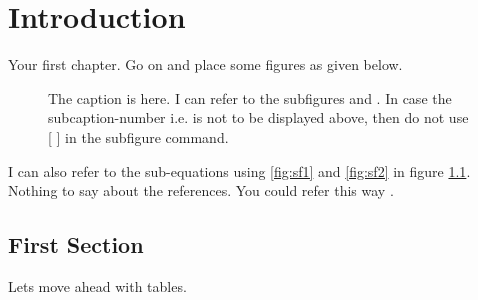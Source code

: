 \chapter{Introduction}
\label{ch:intro}

Your first chapter. Go on and place some figures as given below.
\begin{figure}[!ht]
 	\centering
 	\caption[Use this if required, which goes in `list of figures']{The caption is here. I can refer to the subfigures  and . In case the subcaption-number i.e.  is not to be displayed above, then do not use [ ] in the subfigure command.}
 	\label{fig:f1}
\end{figure}
 
I can also refer to the sub-equations using \ref{fig:sf1} and \ref{fig:sf2} in figure \ref{fig:f1}. Nothing to say about the references. You could refer this way \cite{MC:Clarke,B-Principle}.

\section{First Section}
Lets move ahead with tables.


